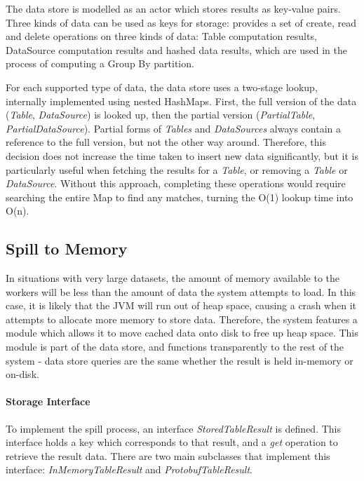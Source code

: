 The data store is modelled as an actor which stores results as key-value pairs. Three kinds of data can be used as keys for storage:
provides a set of create, read and delete operations on three kinds of data: Table computation results, DataSource computation  results and hashed data results, which are used in the process of computing a Group By partition. 

For each supported type of data, the data store uses a two-stage lookup, internally implemented using nested HashMaps. First, the full version of the data (\textit{Table}, \textit{DataSource}) is looked up, then the partial version (\textit{PartialTable}, \textit{PartialDataSource}). Partial forms of \textit{Tables} and \textit{DataSources} always contain a reference to the full version, but not the other way around. Therefore, this decision does not increase the time taken to insert new data significantly, but it is particularly useful when fetching the results for a \textit{Table}, or removing a \textit{Table} or \textit{DataSource}. Without this approach, completing these operations would require searching the entire Map to find any matches, turning the O(1) lookup time into O(n).

\subsection{Spill to Memory}
In situations with very large datasets, the amount of memory available to the workers will be less than the amount of data the system attempts to load. In this case, it is likely that the JVM will run out of heap space, causing a crash when it attempts to allocate more memory to store data. Therefore, the system features a module which allows it to move cached data onto disk to free up heap space. This module is part of the data store, and functions transparently to the rest of the system - data store queries are the same whether the result is held in-memory or on-disk.

\paragraph{Storage Interface}
To implement the spill process, an interface \textit{StoredTableResult} is defined. This interface holds a key which corresponds to that result, and a \textit{get} operation to retrieve the result data. There are two main subclasses that implement this interface: \textit{InMemoryTableResult} and \textit{ProtobufTableResult}. 

